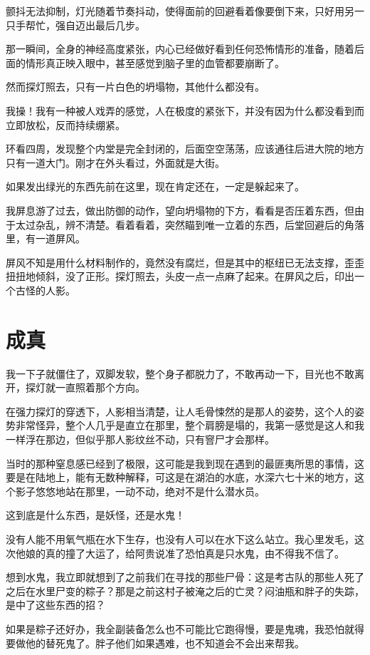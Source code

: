 颤抖无法抑制，灯光随着节奏抖动，使得面前的回避看着像要倒下来，只好用另一只手帮忙，强自迈出最后几步。

那一瞬间，全身的神经高度紧张，内心已经做好看到任何恐怖情形的准备，随着后面的情形真正映入眼中，甚至感觉到脑子里的血管都要崩断了。

然而探灯照去，只有一片白色的坍塌物，其他什么都没有。

我操！我有一种被人戏弄的感觉，人在极度的紧张下，并没有因为什么都没看到而立即放松，反而持续绷紧。

环看四周，发现整个内堂是完全封闭的，后面空空荡荡，应该通往后进大院的地方只有一道大门。刚才在外头看过，外面就是大街。

如果发出绿光的东西先前在这里，现在肯定还在，一定是躲起来了。

我屏息游了过去，做出防御的动作，望向坍塌物的下方，看看是否压着东西，但由于太过杂乱，辨不清楚。看着看着，突然瞄到唯一立着的东西，后堂回避后的角落里，有一道屏风。

屏风不知是用什么材料制作的，竟然没有腐烂，但是其中的枢纽已无法支撑，歪歪扭扭地倾斜，没了正形。探灯照去，头皮一点一点麻了起来。在屏风之后，印出一个古怪的人影。

\chapter{成真}

我一下子就僵住了，双脚发软，整个身子都脱力了，不敢再动一下，目光也不敢离开，探灯就一直照着那个方向。

在强力探灯的穿透下，人影相当清楚，让人毛骨悚然的是那人的姿势，这个人的姿势非常怪异，整个人几乎是直立在那里，整个肩膀是塌的，我第一感觉是这人和我一样浮在那边，但似乎那人影纹丝不动，只有窨尸才会那样。

当时的那种窒息感已经到了极限，这可能是我到现在遇到的最匪夷所思的事情，这要是在陆地上，能有无数种解释，可这是在湖泊的水底，水深六七十米的地方，这个影子悠悠地站在那里，一动不动，绝对不是什么潜水员。

这到底是什么东西，是妖怪，还是水鬼！

没有人能不用氧气瓶在水下生存，也没有人可以在水下这么站立。我心里发毛，这次他娘的真的撞了大运了，给阿贵说准了恐怕真是只水鬼，由不得我不信了。

想到水鬼，我立即就想到了之前我们在寻找的那些尸骨：这是考古队的那些人死了之后在水里尸变的粽子？那是之前这村子被淹之后的亡灵？闷油瓶和胖子的失踪，是中了这些东西的招？

如果是粽子还好办，我全副装备怎么也不可能比它跑得慢，要是鬼魂，我恐怕就得要做他的替死鬼了。胖子他们如果遇难，也不知道会不会出来帮我。


